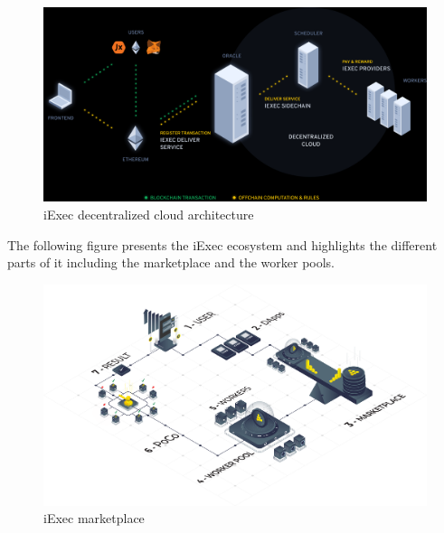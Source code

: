         \begin{landscape}
            \begin{figure}
                \includegraphics[width=\columnwidth]{4-Requirements/figs/iexec-decentralized-cloud.png}
                \caption{iExec decentralized cloud architecture}
            \end{figure}
        \end{landscape}

        The following figure\cite{iexec-marketplace} presents the iExec ecosystem and highlights the different parts of it
        including the marketplace and the worker pools.

        \begin{figure}[!h]
            \includegraphics[width=\columnwidth]{4-Requirements/figs/iexec-marketplace.png}
            \caption{iExec marketplace}
        \end{figure}

